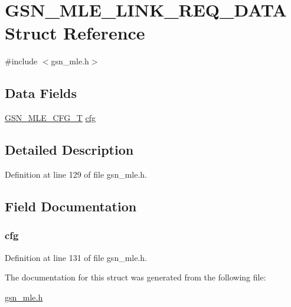 \hypertarget{a00152}{
\section{GSN\_\-MLE\_\-LINK\_\-REQ\_\-DATA Struct Reference}
\label{a00152}
}


{\ttfamily \#include $<$gsn\_\-mle.h$>$}

\subsection*{Data Fields}
\begin{DoxyCompactItemize}
\item 
\hyperlink{a00150}{GSN\_\-MLE\_\-CFG\_\-T} \hyperlink{a00152_a81fc5c006f1e1f6bfd4a7a206ba6e610}{cfg}
\end{DoxyCompactItemize}


\subsection{Detailed Description}


Definition at line 129 of file gsn\_\-mle.h.



\subsection{Field Documentation}
\hypertarget{a00152_a81fc5c006f1e1f6bfd4a7a206ba6e610}{
\subsubsection[{cfg}]{ {\bf cfg}}}
\label{a00152_a81fc5c006f1e1f6bfd4a7a206ba6e610}


Definition at line 131 of file gsn\_\-mle.h.



The documentation for this struct was generated from the following file:\begin{DoxyCompactItemize}
\item 
\hyperlink{a00527}{gsn\_\-mle.h}\end{DoxyCompactItemize}
